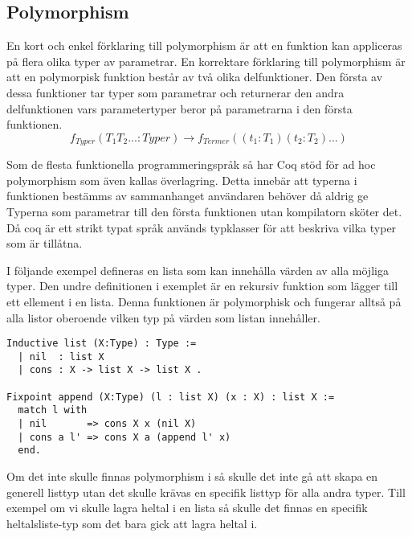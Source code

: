 \subsection{Polymorphism}
En kort och enkel förklaring till polymorphism är att en funktion kan appliceras
på flera olika typer av parametrar.
En korrektare förklaring till polymorphism är att en polymorpisk funktion
består av två olika delfunktioner. Den första av dessa funktioner tar
typer som parametrar och returnerar den andra delfunktionen vars parametertyper
beror på parametrarna i den första funktionen.
\begin{equation}
f_{Typer}(T_1 T_2 ... : Typer)
\rightarrow f_{Termer}((t_1 : T_1) (t_2 : T_2) ...)
\end{equation}

Som de flesta funktionella programmeringspråk så har Coq stöd för ad hoc
polymorphism som även kallas överlagring. Detta innebär att typerna i
funktionen bestämms av sammanhanget användaren behöver då aldrig ge
Typerna som parametrar till den första funktionen utan kompilatorn sköter
det.
Då coq är ett strikt typat språk används
typklasser för att beskriva vilka typer som är tillåtna.

I följande exempel defineras en lista som kan innehålla värden av alla möjliga
typer. Den undre definitionen i exemplet är en rekursiv funktion som lägger till
ett ellement i en lista. Denna funktionen är polymorphisk och fungerar alltså på
alla listor oberoende vilken typ på värden som listan innehåller.
\begin{lstlisting}
Inductive list (X:Type) : Type :=
  | nil  : list X
  | cons : X -> list X -> list X .

Fixpoint append (X:Type) (l : list X) (x : X) : list X :=
  match l with
  | nil       => cons X x (nil X)
  | cons a l' => cons X a (append l' x)
  end.
\end{lstlisting}

Om det inte skulle finnas polymorphism i \coq så skulle det inte
gå att skapa en generell listtyp utan det skulle krävas en specifik
listtyp för alla andra typer. Till exempel om vi skulle lagra heltal
i en lista så skulle det finnas en specifik heltalsliste-typ som det bara
gick att lagra heltal i.

